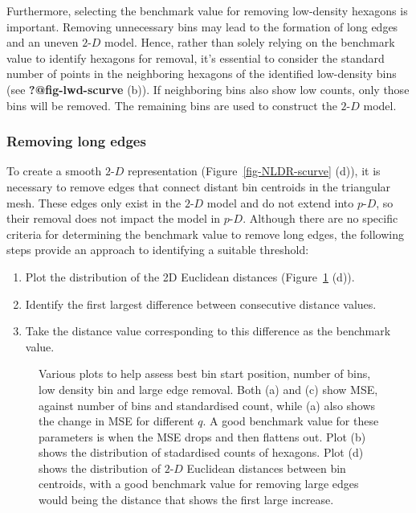 \documentclass[
  12pt]{article}
\providecommand{\tightlist}{%
  \setlength{\itemsep}{0pt}\setlength{\parskip}{0pt}}\usepackage{longtable,booktabs,array}
\def\tightlist{}
\newcommand\pD{$p\text{-}D$}
\newcommand\gD{$2\text{-}D$}
\begin{document}
Furthermore, selecting the benchmark value for removing low-density
hexagons is important. Removing unnecessary bins may lead to the
formation of long edges and an uneven \gD{} model. Hence, rather than
solely relying on the benchmark value to identify hexagons for removal,
it's essential to consider the standard number of points in the
neighboring hexagons of the identified low-density bins (see
\textbf{?@fig-lwd-scurve} (b)). If neighboring bins also show low
counts, only those bins will be removed. The remaining bins are used to
construct the \gD{} model.

\subsubsection{Removing long edges}\label{removing-long-edges}

To create a smooth \gD{} representation (Figure~\ref{fig-NLDR-scurve}
(d)), it is necessary to remove edges that connect distant bin centroids
in the triangular mesh. These edges only exist in the \gD{} model and do
not extend into \pD{}, so their removal does not impact the model in
\pD{}. Although there are no specific criteria for determining the
benchmark value to remove long edges, the following steps provide an
approach to identifying a suitable threshold:

\begin{enumerate}
\def\labelenumi{\arabic{enumi}.}
\tightlist
\item
  Plot the distribution of the 2D Euclidean distances
  (Figure~\ref{fig-param-scurve} (d)).
\item
  Identify the first largest difference between consecutive distance
  values.
\item
  Take the distance value corresponding to this difference as the
  benchmark value.
\end{enumerate}

\begin{figure}[H]


\caption{\label{fig-param-scurve}Various plots to help assess best bin
start position, number of bins, low density bin and large edge removal.
Both (a) and (c) show MSE, against number of bins and standardised
count, while (a) also shows the change in MSE for different \(q\). A
good benchmark value for these parameters is when the MSE drops and then
flattens out. Plot (b) shows the distribution of stadardised counts of
hexagons. Plot (d) shows the distribution of \(2\text{-}D\) Euclidean
distances between bin centroids, with a good benchmark value for
removing large edges would being the distance that shows the first large
increase.}

\end{figure}%
\end{document}
